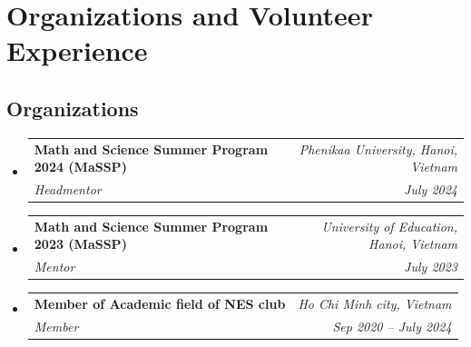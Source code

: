 \documentclass[letterpaper,11pt]{article}
\makeatletter
\newcommand{\resumeOrganizationHeading}[4]{
	\vspace{-2pt}\item
	\begin{tabular*}{0.97\textwidth}[t]{l@{\extracolsep{\fill}}r}
		\textbf{#1} & \textit{\small #2} \\
		\textit{\small#3} & \textit{\small #4} 
	\end{tabular*}\vspace{-7pt}
}
\newcommand{\resumeSubHeadingListStart}{\begin{itemize}[leftmargin=0.15in, label={}]}
\newcommand{\resumeSubHeadingListEnd}{\end{itemize}}
\makeatother
\begin{document}
	
	
	
	
	
	
	
	
	
	
	 \section{Organizations and Volunteer Experience}
\subsection*{Organizations}
\resumeSubHeadingListStart
\resumeOrganizationHeading{Math and Science Summer Program 2024 (MaSSP)}{Phenikaa University, Hanoi, Vietnam}{Headmentor}{July 2024}
\resumeOrganizationHeading{Math and Science Summer Program 2023 (MaSSP)}{University of Education, Hanoi, Vietnam}{Mentor}{July 2023}
\resumeOrganizationHeading
{Member of Academic field of NES club}{Ho Chi Minh city, Vietnam}{Member}{Sep 2020 -- July 2024}
\resumeSubHeadingListEnd
\end{document}
